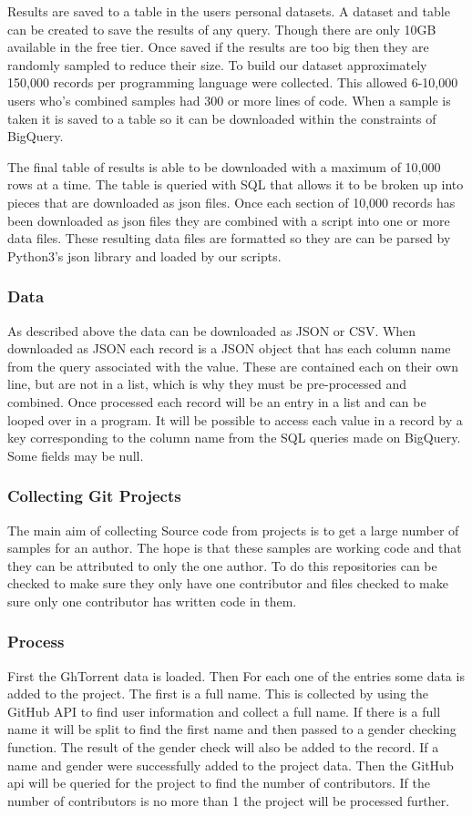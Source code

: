 \documentclass{article}
\begin{document}
Results are saved to a table in the users personal datasets. A dataset and table can be created to save the results of any query. Though there are only 10GB available in the free tier. Once saved if the results are too big then they are randomly sampled to reduce their size. To build our dataset approximately 150,000 records per programming language were collected. This allowed 6-10,000 users who's combined samples had 300 or more lines of code. When a sample is taken it is saved to a table so it can be downloaded within the constraints of BigQuery.

The final table of results is able to be downloaded with a maximum of 10,000 rows at a time. The table is queried with SQL that allows it to be broken up into pieces that are downloaded as json files. Once each section of 10,000 records has been downloaded as json files they are combined with a script into one or more data files. These resulting data files are formatted so they are can be parsed by Python3's json library and loaded by our scripts.

\subsubsection*{Data}
As described above the data can be downloaded as JSON or CSV. When downloaded as JSON each record is a JSON object that has each column name from the query associated with the value. These are contained each on their own line, but are not in a list, which is why they must be pre-processed and combined. Once processed each record will be an entry in a list and can be looped over in a program. It will be possible to access each value in a record by a key corresponding to the column name from the SQL queries made on BigQuery. Some fields may be null.

\subsubsection{Collecting Git Projects}
The main aim of collecting Source code from projects is to get a large number of samples for an author. The hope is that these samples are working code and that they can be attributed to only the one author. To do this repositories can be checked to make sure they only have one contributor and files checked to make sure only one contributor has written code in them.

\subsubsection*{Process}
First the GhTorrent data is loaded. Then For each one of the entries some data is added to the project. The first is a full name. This is collected by using the GitHub API to find user information and collect a full name. If there is a full name it will be split to find the first name and then passed to a gender checking function. The result of the gender check will also be added to the record. If a name and gender were successfully added to the project data. Then the GitHub api will be queried for the project to find the number of contributors. If the number of contributors is no more than 1 the project will be processed further.
\end{document}
